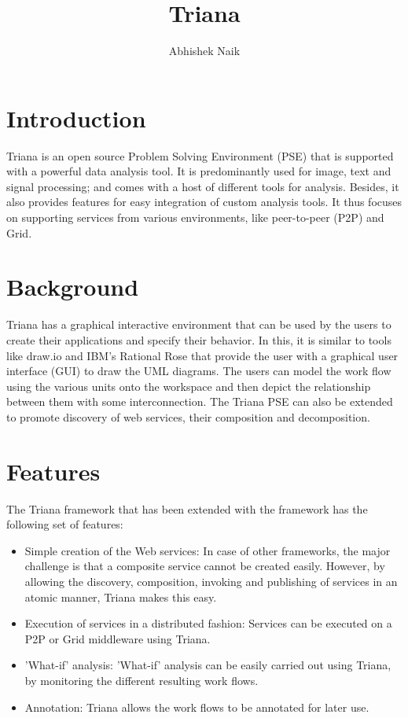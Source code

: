 \documentclass[9pt,twocolumn,twoside]{styles/osajnl}
\title{Triana}
\author{Abhishek Naik}
\affil[1]{School of Informatics and Computing, Bloomington, IN 47408, U.S.A.}
\affil[*]{Corresponding authors: ahnaik@indiana.edu}
\begin{document}
\maketitle

\section{Introduction}

Triana is an open source Problem Solving Environment (PSE) that is
supported with a powerful data analysis tool.  It is predominantly
used for image, text and signal processing; and comes with a host of
different tools for analysis.  Besides, it also provides features for
easy integration of custom analysis tools.  It thus focuses on
supporting services from various environments, like peer-to-peer (P2P)
and Grid.

\section{Background}
\cite{TrianaDocumentation1} Triana has a graphical interactive
environment that can be used by the users to create their applications
and specify their behavior.  In this, it is similar to tools like
\cite{DrawIO} draw.io and \cite{IBM-Rational-Rose} IBM's Rational Rose
that provide the user with a graphical user interface (GUI) to draw
the UML diagrams.  The users can model the work flow using the various
units onto the workspace and then depict the relationship between them
with some interconnection.  The Triana PSE can also be extended to promote 
discovery of web services, their composition and decomposition.

\section{Features}
The Triana framework that has been extended with the framework has the 
following set of features: 

\begin{itemize} 

\item Simple creation of the Web services: In case of other frameworks, 
the major challenge is that a composite service cannot be created 
easily. However, by allowing the discovery, composition, invoking and 
publishing of services in an atomic manner, Triana makes this easy. 

\item Execution of services in a distributed fashion: Services can be 
executed on a P2P or Grid middleware using Triana. 

\item 'What-if' analysis: 'What-if' analysis can be easily carried out 
using Triana, by monitoring the different resulting work flows. 

\item Annotation: Triana allows the work flows to be annotated for later 
use. 

\end{itemize}
\end{document}
